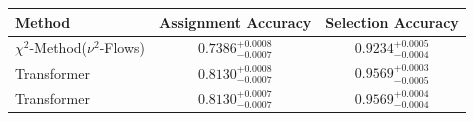     \begin{tabular}{lcc}
        \toprule
        Method & Assignment Accuracy & Selection Accuracy \\
        \midrule
        $\chi^2$-Method($\nu^2$-Flows) & $0.7386_{-0.0007}^{+0.0008}$ & $0.9234_{-0.0004}^{+0.0005}$ \\
        Transformer & $0.8130_{-0.0007}^{+0.0008}$ & $0.9569_{-0.0005}^{+0.0003}$ \\
        Transformer & $0.8130_{-0.0007}^{+0.0007}$ & $0.9569_{-0.0004}^{+0.0004}$ \\
        \bottomrule
    \end{tabular}
